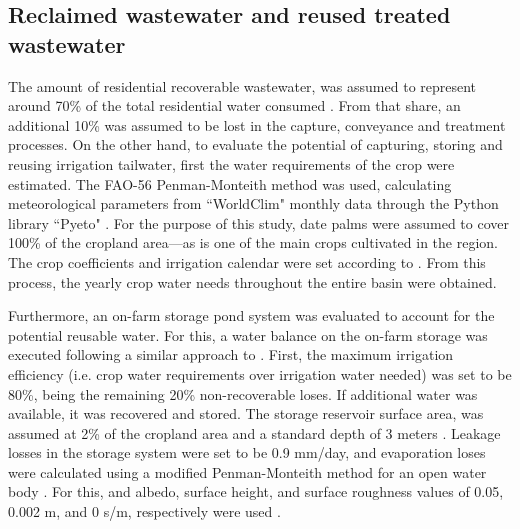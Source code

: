 

\subsection{Reclaimed wastewater and reused treated wastewater}
The amount of residential recoverable wastewater, was assumed to represent around 70\% of the total residential water consumed \cite{unescoWastewaterUntappedResource2017}. From that share, an additional 10\% was assumed to be lost in the capture, conveyance and treatment processes.
On the other hand, to evaluate the potential of capturing, storing and reusing irrigation tailwater, first the water requirements of the crop were estimated. The FAO-56 Penman-Monteith method \cite{allenFAOIrrigationDrainage1998} was used, calculating meteorological parameters from ``WorldClim" monthly data \cite{WorldClimGlobalClimate} through the Python library ``Pyeto" \cite{pyeto}. For the purpose of this study, date palms were assumed to cover 100\% of the cropland area---as is one of the main crops cultivated in the region. The crop coefficients and irrigation calendar were set according to \citet{almullaNWSAS}. From this process, the yearly crop water needs throughout the entire basin were obtained.

Furthermore, an on-farm storage pond system was evaluated to account for the potential reusable water. For this, a water balance on the on-farm storage was executed following a similar approach to \citet{reinhartSimulatedWaterQuality2019}. First, the maximum irrigation efficiency (i.e. crop water requirements over irrigation water needed) was set to be 80\%, being the remaining 20\% non-recoverable loses. If additional water was available, it was recovered and stored. The storage reservoir surface area, was assumed at 2\% of the cropland area and a standard depth of 3 meters \cite{reinhartSimulatedWaterQuality2019}. Leakage losses in the storage system were set to be 0.9 mm/day, and evaporation loses were calculated using a modified Penman-Monteith method for an open water body \cite{reinhartSimulatedWaterQuality2019}. For this, and albedo, surface height, and surface roughness values of 0.05, 0.002 m, and 0 s/m, respectively were used \cite{princeczarneckijobym.QuantifyingCaptureUse2017}.

